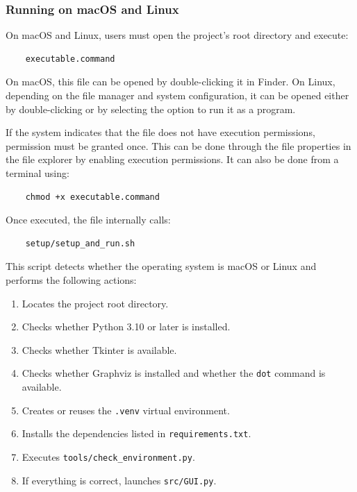 \documentclass[letterpaper,12pt,oneside]{article}
\begin{document}
\subsubsection{Running on macOS and Linux}

On macOS and Linux, users must open the project's root directory and execute:

\begin{verbatim}
	executable.command
\end{verbatim}

On macOS, this file can be opened by double-clicking it in Finder. On Linux, depending on the file manager and system configuration, it can be opened either by double-clicking or by selecting the option to run it as a program.

If the system indicates that the file does not have execution permissions, permission must be granted once. This can be done through the file properties in the file explorer by enabling execution permissions. It can also be done from a terminal using:

\begin{verbatim}
	chmod +x executable.command
\end{verbatim}

Once executed, the file internally calls:

\begin{verbatim}
	setup/setup_and_run.sh
\end{verbatim}

This script detects whether the operating system is macOS or Linux and performs the following actions:

\begin{enumerate}
	\item Locates the project root directory.
	\item Checks whether Python 3.10 or later is installed.
	\item Checks whether Tkinter is available.
	\item Checks whether Graphviz is installed and whether the \texttt{dot} command is available.
	\item Creates or reuses the \texttt{.venv} virtual environment.
	\item Installs the dependencies listed in \texttt{requirements.txt}.
	\item Executes \texttt{tools/check\_environment.py}.
	\item If everything is correct, launches \texttt{src/GUI.py}.
\end{enumerate}
\end{document}
